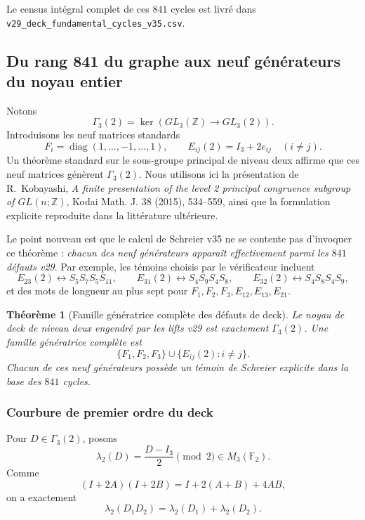 \documentclass[11pt,a4paper]{article}
\newtheorem{theorem}{Théorème}[section]
\begin{document}
Le census int\'egral complet de ces $841$ cycles est livr\'e dans
\texttt{v29\_deck\_fundamental\_cycles\_v35.csv}.

\subsection{Du rang 841 du graphe aux neuf g\'en\'erateurs du noyau entier}

Notons
\[
 \Gamma_3(2)=\ker\!\left(GL_3(\mathbb Z)\longrightarrow GL_3(2)\right).
\]
Introduisons les neuf matrices standards
\[
 F_i=\operatorname{diag}(1,\ldots,-1,\ldots,1),
 \qquad
 E_{ij}(2)=I_3+2e_{ij}\quad(i\neq j).
\]
Un th\'eor\`eme standard sur le sous-groupe principal de niveau deux affirme que ces neuf matrices
g\'en\`erent $\Gamma_3(2)$. Nous utilisons ici la pr\'esentation de R.~Kobayashi,
\emph{A finite presentation of the level 2 principal congruence subgroup of $GL(n;\mathbb Z)$},
Kodai Math. J. 38 (2015), 534--559, ainsi que la formulation explicite reproduite dans la litt\'erature
ult\'erieure.

Le point nouveau est que le calcul de Schreier v35 ne se contente pas d'invoquer ce th\'eor\`eme :
\emph{chacun des neuf g\'en\'erateurs appara\^it effectivement parmi les $841$ d\'efauts v29}.
Par exemple, les t\'emoins choisis par le v\'erificateur incluent
\[
 E_{23}(2)\leftrightarrow S_5S_7S_5S_{11},
 \qquad
 E_{31}(2)\leftrightarrow S_4S_9S_4S_8,
 \qquad
 E_{32}(2)\leftrightarrow S_4S_8S_4S_9,
\]
et des mots de longueur au plus sept pour $F_1,F_2,F_3,E_{12},E_{13},E_{21}$.

\begin{theorem}[Famille g\'en\'eratrice compl\`ete des d\'efauts de deck]\label{thm:v35-deck-complete}
Le noyau de deck de niveau deux engendr\'e par les lifts v29 est exactement $\Gamma_3(2)$.
Une famille g\'en\'eratrice compl\`ete est
\begin{equation}\label{eq:v35-nine-kernel-generators}
 \boxed{\{F_1,F_2,F_3\}\cup\{E_{ij}(2):i\neq j\}.}
\end{equation}
Chacun de ces neuf g\'en\'erateurs poss\`ede un t\'emoin de Schreier explicite dans la base des
$841$ cycles.
\end{theorem}

\subsubsection{Courbure de premier ordre du deck}

Pour $D\in\Gamma_3(2)$, posons
\begin{equation}\label{eq:v35-lambda2}
 \boxed{\lambda_2(D)=\frac{D-I_3}{2}\pmod2\in M_3(\mathbb F_2).}
\end{equation}
Comme
\[
 (I+2A)(I+2B)=I+2(A+B)+4AB,
\]
on a exactement
\begin{equation}\label{eq:v35-lambda2-additive}
 \boxed{\lambda_2(D_1D_2)=\lambda_2(D_1)+\lambda_2(D_2).}
\end{equation}
\end{document}

